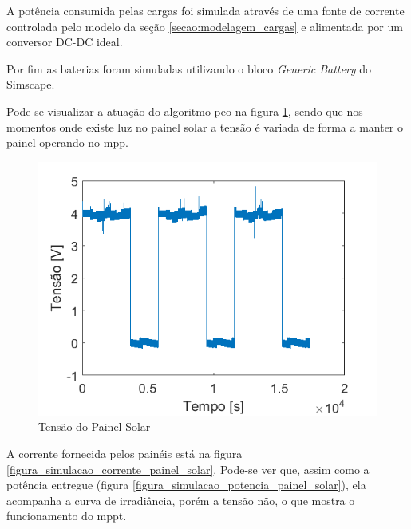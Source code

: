 A potência consumida pelas cargas foi simulada através de uma fonte de corrente controlada pelo modelo da seção \ref{secao:modelagem_cargas} e alimentada por um conversor DC-DC ideal.

Por fim as baterias foram simuladas utilizando o bloco \textit{Generic Battery} do Simscape.

Pode-se visualizar a atuação do algoritmo \gls{peo} na figura \ref{figura_simulacao_tensao_painel_solar}, sendo que nos momentos onde existe luz no painel solar a tensão é variada de forma a manter o painel operando no \gls{mpp}.

\begin{figure}[!htpb]
\begin{center}
\includegraphics[scale=0.5]{figures/simulatedSolarPanelVoltage.png}
\caption{Tensão do Painel Solar}
\label{figura_simulacao_tensao_painel_solar}
\end{center}
\end{figure}

A corrente fornecida pelos painéis está na figura \ref{figura_simulacao_corrente_painel_solar}. Pode-se ver que, assim como a potência entregue (figura \ref{figura_simulacao_potencia_painel_solar}), ela acompanha a curva de irradiância, porém a tensão não, o que mostra o funcionamento do \gls{mppt}. 

